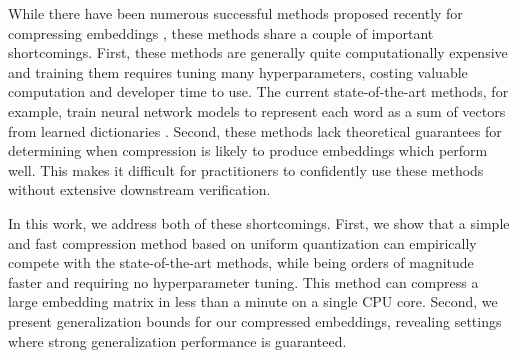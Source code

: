 While there have been numerous successful methods proposed recently for compressing embeddings \citep{sparse16,andrews16,dccl17,kway18}, these methods share a couple of important shortcomings.
First, these methods are generally quite computationally expensive and training them requires tuning many hyperparameters, costing valuable computation and developer time to use.
The current state-of-the-art methods, for example, train neural network models to represent each word as a sum of vectors from learned dictionaries \citep{dccl17,kway18}.
Second, these methods lack theoretical guarantees for determining when compression is likely to produce embeddings which perform well.
This makes it difficult for practitioners to confidently use these methods without extensive downstream verification.

In this work, we address both of these shortcomings.
First, we show that a simple and fast compression method based on uniform quantization can empirically compete with the state-of-the-art methods, while being orders of magnitude faster and requiring no hyperparameter tuning.
This method can compress a large embedding matrix in less than a minute on a single CPU core.
Second, we present generalization bounds for our compressed embeddings, revealing settings where strong generalization performance is guaranteed.





